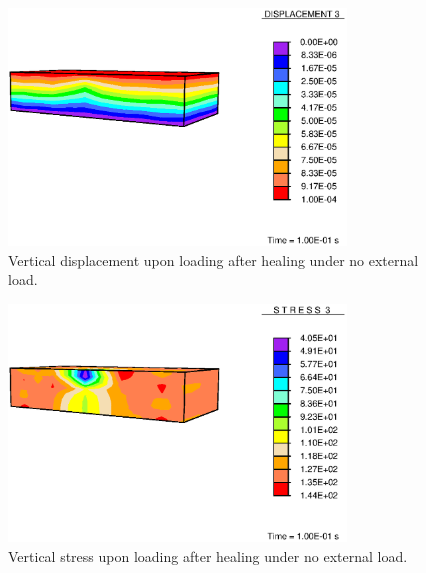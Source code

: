 \begin{figure}[!hpt]
\centering
\includegraphics[width=0.8\textwidth]
                {images/examples/lagrangian/healing/healed-vertical-displacement} 
\caption{Vertical displacement upon loading after healing under no external load.}
\label{healing-vertical-displacement}
\end{figure}

\begin{figure}[!hpt]
\centering
\includegraphics[width=0.8\textwidth]
                {images/examples/lagrangian/healing/healed-vertical-stress} 
\caption{Vertical stress upon loading after healing under no external load.}
\label{healing-vertical-stress}
\end{figure}


%

